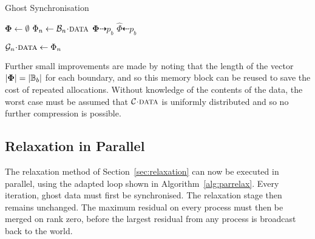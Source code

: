 \documentclass[twoside]{IIBproject}
\newcommand{\vect} [1] {\bm{#1}}
\newcommand{\dra}{\dashrightarrow}
\newcommand{\dla}{\dashleftarrow}
\newcommand{\acc}{{\mkern 0.5mu\cdot\mkern 0.5mu}}
\numberwithin{figure}{section}
\begin{document}
        \begin{algorithm}[!htbp]
            \caption{Ghost Synchronisation}
            \label{alg:sync-sendrecv}

            \begin{algorithmic}
                \Statex
                    \State $\vect{\Phi} \gets \emptyset$
                        \State $\Phi_n \gets \mathcal{B}_n\acc\textproc{data}$
                    \EndFor
                    \Send $\vect{\Phi} \dra p_b$
                \EndFor
                \Statex
                    \Recv $\hat \Phi \dla p_b$

                        \State $\mathcal{G}_n\acc\textproc{data} \gets \Phi_n$
                    \EndFor
                \EndFor
            \end{algorithmic}
        \end{algorithm}

        
        Further small improvements are made by noting that the length of the vector $\abs{\vect{\Phi}} = \abs{\mathbb{B}_b}$ for each boundary, and so this memory block can be reused to save the cost of repeated allocations. Without knowledge of the contents of the data, the worst case must be assumed that $\mathcal{C}\acc\textproc{data}$ is uniformly distributed and so no further compression is possible. 



    \subsection{Relaxation in Parallel} %
        \label{sec:parrelax}

        The relaxation method of Section~\ref{sec:relaxation} can now be executed in parallel, using the adapted loop shown in Algorithm~\ref{alg:parrelax}. Every iteration, ghost data must first be synchronised. The relaxation stage then remains unchanged. The maximum residual on every process must then be merged on rank zero, before the largest residual from any process is broadcast back to the world.
\end{document}
